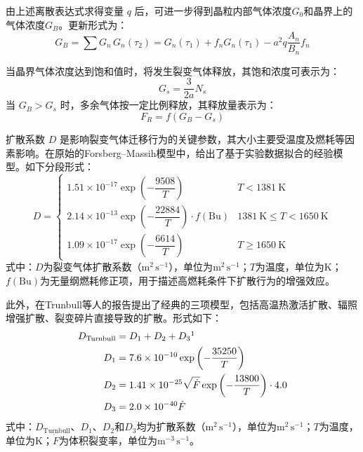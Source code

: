 由上述离散表达式求得变量 $q$ 后，可进一步得到晶粒内部气体浓度$G_0$和晶界上的气体浓度$G_B$。更新形式为：
\begin{equation}
	G_B = \sum G_n \, G_n(\tau_2) = G_n(\tau_1) + f_n G_n(\tau_1) - a^2 q \frac{A_n}{B_n} f_n
\end{equation}

当晶界气体浓度达到饱和值时，将发生裂变气体释放，其饱和浓度可表示为：
\begin{equation}
	G_s = \frac{3}{2a} N_s
\end{equation}
当 $G_B > G_s$ 时，多余气体按一定比例释放，其释放量表示为：
\begin{equation}
	F_R = f \left(G_B - G_s\right)
\end{equation}

扩散系数 $D$ 是影响裂变气体迁移行为的关键参数，其大小主要受温度及燃耗等因素影响。在原始的Forsberg--Massih模型中，给出了基于实验数据拟合的经验模型。如下分段形式：
\begin{equation}
	D =
	\begin{cases}
		1.51\times10^{-17}\exp\left(-\dfrac{9508}{T}\right)                      & T < 1381~\mathrm{K}                     \\
		2.14\times10^{-13}\exp\left(-\dfrac{22884}{T}\right)\cdot f(\mathrm{Bu}) & 1381~\mathrm{K} \le T < 1650~\mathrm{K} \\
		1.09\times10^{-17}\exp\left(-\dfrac{6614}{T}\right)                      & T \ge 1650~\mathrm{K}
	\end{cases}
\end{equation}
\noindent 式中：$D$为裂变气体扩散系数（$\mathrm{m^2\,s^{-1}}$），单位为$\mathrm{m^2\,s^{-1}}$；$T$为温度，单位为$\mathrm{K}$；$f(\mathrm{Bu})$为无量纲燃耗修正项，用于描述高燃耗条件下扩散行为的增强效应。

此外，在Trunbull等人\cite{denisSimulationIsothermalFission1996}的报告提出了经典的三项模型，包括高温热激活扩散、辐照增强扩散、裂变碎片直接导致的扩散。形式如下：
\begin{align}
	D_{\mathrm{Turnbull}} & = D_1 + D_2 + D_3\footnotemark                                                    \\
	D_1                   & = 7.6 \times 10^{-10} \exp\left(-\frac{35250}{T}\right)                           \\
	D_2                   & = 1.41 \times 10^{-25} \sqrt{\dot{F}} \exp\left(-\frac{13800}{T}\right) \cdot 4.0 \\
	D_3                   & = 2.0 \times 10^{-40} \dot{F}
\end{align}
\noindent 式中：$D_{\mathrm{Turnbull}}$、$D_1$、$D_2$和$D_3$均为扩散系数（$\mathrm{m^2\,s^{-1}}$），单位为$\mathrm{m^2\,s^{-1}}$；$T$为温度，单位为$\mathrm{K}$；$\dot{F}$为体积裂变率，单位为$\mathrm{m^{-3}\,s^{-1}}$。

